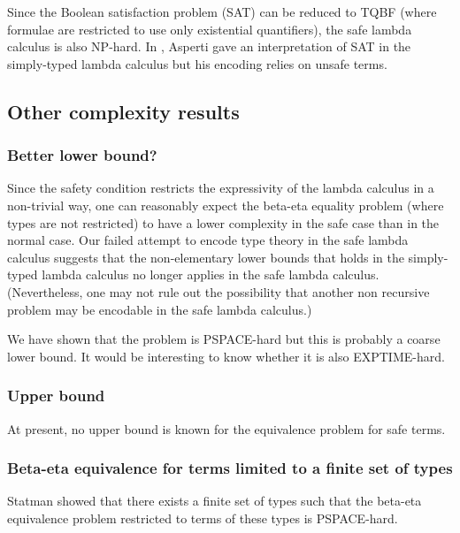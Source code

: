 \begin{remark}
Since the Boolean satisfaction problem (SAT) can be reduced to TQBF
(where formulae are restricted to use only existential quantifiers),
the safe lambda calculus is also NP-hard. In \cite{asperti-np},
Asperti gave an interpretation of SAT in the simply-typed lambda
calculus but his encoding relies on unsafe terms.
\end{remark}

\subsection{Other complexity results}




\subsubsection{Better lower bound?}
Since the safety condition restricts the expressivity of the lambda
calculus in a non-trivial way, one can reasonably expect the
beta-eta equality problem (where types are not restricted) to have a
lower complexity in the safe case than in the normal case. Our
failed attempt to encode type theory in the safe lambda calculus
suggests that the non-elementary lower bounds that holds in the
simply-typed lambda calculus no longer applies in the safe lambda
calculus. (Nevertheless, one may not rule out the possibility that
another non recursive problem may be encodable in the safe lambda
calculus.)

We have shown that the problem is PSPACE-hard but this is probably a coarse lower bound. It would be interesting to know
whether it is also EXPTIME-hard.

\subsubsection{Upper bound}
At present, no upper bound is known for the equivalence problem for safe terms.


\subsubsection{Beta-eta equivalence for terms limited to a finite set of types}
Statman showed \cite{Statman:1979:TLE} that there exists a finite
set of types such that the beta-eta equivalence problem restricted to terms
of these types is PSPACE-hard.

